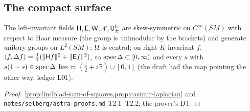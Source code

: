 \subsection{The compact surface}

\begin{proposition}
\label{prop:selberg-letters-laplacian}
The left-invariant fields $\mathsf H,\mathsf E,\mathsf W,\mathcal X,{\mathsf U^{\mathrm h}_{\pm}}$ are skew-symmetric on $C^\infty(SM)$
with respect to Haar measure (the group is unimodular by the brackets) and generate unitary groups
on $L^2(SM)$; $\Omega$ is central; on right-$K$-invariant $f$, $\langle f,\Delta f\rangle =
\tfrac14(\|\mathsf H f\|^2+\|\mathsf E f\|^2)$, so $\operatorname{spec}\Delta\subset[0,\infty)$ and every
$s$ with $s(1-s)\in\operatorname{spec}\Delta$ lies in $(\tfrac12+i\mathbb R)\cup[0,1]$ (the draft had
the map pointing the other way, ledger L01).
\end{proposition}
\begin{proof}
\cref{prop:lindblad-sum-of-squares,prop:casimir-laplacian} and \texttt{notes/selberg/astra-proofs.md}
T2.1--T2.2; the prover's D1.
\end{proof}

